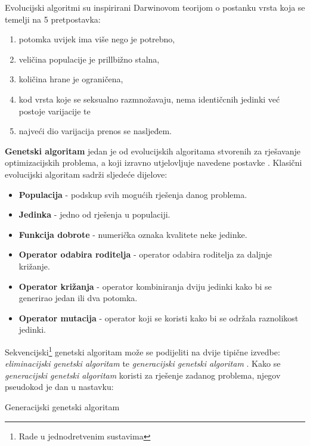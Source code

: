 \documentclass[times, utf8, zavrsni]{fer}
\begin{document}
Evolucijski algoritmi su inspirirani Darwinovom teorijom o postanku vrsta koja se temelji na 5 pretpostavka:

\begin{enumerate}
	\item potomka uvijek ima više nego je potrebno,
	\item veličina populacije je prillbižno stalna,
	\item količina hrane je ograničena,
	\item kod vrsta koje se seksualno razmnožavaju, nema identičcnih jedinki već postoje varijacije te
	\item najveći dio varijacija prenos se nasljeđem.
\end{enumerate}

	\textbf{Genetski algoritam} jedan je od evolucijskih algoritama stvorenih za rješavanje optimizacijskih problema, a koji izravno utjelovljuje navedene postavke \citep{cupic-skripta}.  Klasični evolucijski algoritam sadrži sljedeće dijelove:
	
\begin{itemize}
	\item \textbf{Populacija} - podskup svih mogućih rješenja danog problema.
	\item \textbf{Jedinka} - jedno od rješenja u populaciji.
	\item \textbf{Funkcija dobrote} - numerička oznaka kvalitete neke jedinke.
	\item \textbf{Operator odabira roditelja} - operator odabira roditelja za daljnje križanje.
	\item \textbf{Operator križanja} - operator kombiniranja dviju jedinki kako bi se generirao jedan ili dva potomka.
	\item \textbf{Operator mutacija} - operator koji se koristi kako bi se održala raznolikost jedinki.
\end{itemize}

Sekvencijski\footnote{Rade u jednodretvenim sustavima} genetski algoritam može se podijeliti na dvije tipične izvedbe: \emph{eliminacijski genetski algoritam}  te \emph{generacijski genetski algoritam}  \citep{cupic-disertacija}. Kako se \emph{generacijski genetski algoritam} koristi za rješenje zadanog problema, njegov pseudokod je dan u nastavku:

\begin{algorithm}
\caption{Generacijski genetski algoritam}
\label{algo:generational-algo}
\begin{algorithmic}
\ENDFOR
{}
\ENDFOR
{}
\end{algorithmic}
\end{algorithm}
\end{document}
